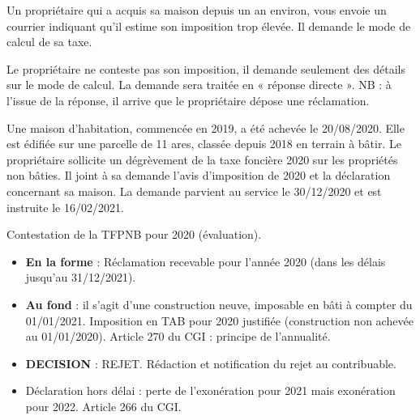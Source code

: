 \documentclass[a4paper, 12pt]{exam}
\begin{document}
\begin{questions}
	
	\question Un propriétaire qui a acquis sa maison depuis un an environ, vous envoie un courrier indiquant qu'il estime son imposition trop élevée. Il demande le mode de calcul de sa taxe.
	\begin{solution}
		Le propriétaire ne conteste pas son imposition, il demande seulement des détails sur le mode de calcul. La demande sera traitée en « réponse directe ». 
		NB : à l'issue de la réponse, il arrive que le propriétaire dépose une réclamation.
	\end{solution}
	
	\question Une maison d'habitation, commencée en 2019, a été achevée le 20/08/2020. Elle est édifiée sur une parcelle de 11 ares, classée depuis 2018 en terrain à bâtir. Le propriétaire sollicite un dégrèvement de la taxe foncière 2020 sur les propriétés non bâties. Il joint à sa demande l'avis d'imposition de 2020 et la déclaration concernant sa maison. La demande parvient au service le 30/12/2020 et est instruite le 16/02/2021.
	\begin{solution}
		Contestation de la TFPNB pour 2020 (évaluation).
		\begin{itemize}
			\item \textbf{En la forme} : Réclamation recevable pour l'année 2020 (dans les délais jusqu'au 31/12/2021).
			\item \textbf{Au fond} : il s'agit d'une construction neuve, imposable en bâti à compter du 01/01/2021. Imposition en TAB pour 2020 justifiée (construction non achevée au 01/01/2020). Article 270 du CGI : principe de l'annualité.
			\item \textbf{DECISION} : REJET. Rédaction et notification du rejet au contribuable.
			\item Déclaration hors délai : perte de l'exonération pour 2021 mais exonération pour 2022. Article 266 du CGI.
		\end{itemize}
	\end{solution}
	

\end{questions}
\end{document}
